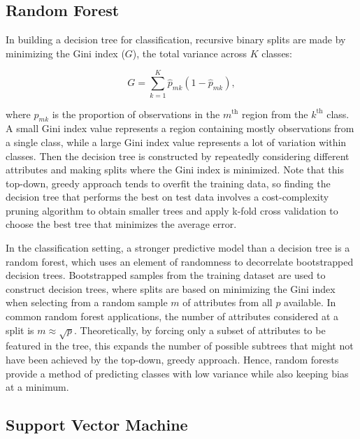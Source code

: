 \documentclass[12pt,twoside]{reedthesis}
\begin{document}
\hypertarget{random-forest}{%
\subsection{Random Forest}\label{random-forest}}

In building a decision tree for classification, recursive binary splits are made by minimizing the Gini index (\(G\)), the total variance across \(K\) classes:

\[G = \sum_{k = 1}^K\hat{p}_{mk}(1 - \hat{p}_{mk}),\]

where \(\hat{p}_{mk}\) is the proportion of observations in the \(m^{\text{th}}\) region from the \(k^{\text{th}}\) class. A small Gini index value represents a region containing mostly observations from a single class, while a large Gini index value represents a lot of variation within classes. Then the decision tree is constructed by repeatedly considering different attributes and making splits where the Gini index is minimized. Note that this top-down, greedy approach tends to overfit the training data, so finding the decision tree that performs the best on test data involves a cost-complexity pruning algorithm to obtain smaller trees and apply k-fold cross validation to choose the best tree that minimizes the average error.

In the classification setting, a stronger predictive model than a decision tree is a random forest, which uses an element of randomness to decorrelate bootstrapped decision trees. Bootstrapped samples from the training dataset are used to construct decision trees, where splits are based on minimizing the Gini index when selecting from a random sample \(m\) of attributes from all \(p\) available. In common random forest applications, the number of attributes considered at a split is \(m \approx \sqrt{p}\). Theoretically, by forcing only a subset of attributes to be featured in the tree, this expands the number of possible subtrees that might not have been achieved by the top-down, greedy approach. Hence, random forests provide a method of predicting classes with low variance while also keeping bias at a minimum.

\hypertarget{support-vector-machine}{%
\subsection{Support Vector Machine}\label{support-vector-machine}}
\end{document}
